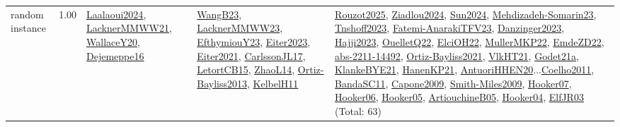 {\begin{longtable}{p{3cm}r>{\raggedright\arraybackslash}p{6cm}>{\raggedright\arraybackslash}p{6cm}>{\raggedright\arraybackslash}p{8cm}}
\index{random instance}\index{Benchmarks!random instance}random instance &  1.00 & \hyperref[detail:Laalaoui2024]{Laalaoui2024}, \hyperref[detail:LacknerMMWW21]{LacknerMMWW21}, \hyperref[detail:WallaceY20]{WallaceY20}, \hyperref[detail:Dejemeppe16]{Dejemeppe16} & \hyperref[detail:WangB23]{WangB23}, \hyperref[detail:LacknerMMWW23]{LacknerMMWW23}, \hyperref[detail:EfthymiouY23]{EfthymiouY23}, \hyperref[detail:Eiter2023]{Eiter2023}, \hyperref[detail:Eiter2021]{Eiter2021}, \hyperref[detail:CarlssonJL17]{CarlssonJL17}, \hyperref[detail:LetortCB15]{LetortCB15}, \hyperref[detail:ZhaoL14]{ZhaoL14}, \hyperref[detail:Ortiz-Bayliss2013]{Ortiz-Bayliss2013}, \hyperref[detail:KelbelH11]{KelbelH11} & \hyperref[detail:Rouzot2025]{Rouzot2025}, \hyperref[detail:Ziadlou2024]{Ziadlou2024}, \hyperref[detail:Sun2024]{Sun2024}, \hyperref[detail:Mehdizadeh-Somarin23]{Mehdizadeh-Somarin23}, \hyperref[detail:Tnshoff2023]{Tnshoff2023}, \hyperref[detail:Fatemi-AnarakiTFV23]{Fatemi-AnarakiTFV23}, \hyperref[detail:Danzinger2023]{Danzinger2023}, \hyperref[detail:Hajji2023]{Hajji2023}, \hyperref[detail:OuelletQ22]{OuelletQ22}, \hyperref[detail:ElciOH22]{ElciOH22}, \hyperref[detail:MullerMKP22]{MullerMKP22}, \hyperref[detail:EmdeZD22]{EmdeZD22}, \hyperref[detail:abs-2211-14492]{abs-2211-14492}, \hyperref[detail:Ortiz-Bayliss2021]{Ortiz-Bayliss2021}, \hyperref[detail:VlkHT21]{VlkHT21}, \hyperref[detail:Godet21a]{Godet21a}, \hyperref[detail:KlankeBYE21]{KlankeBYE21}, \hyperref[detail:HanenKP21]{HanenKP21}, \hyperref[detail:AntuoriHHEN20]{AntuoriHHEN20}...\hyperref[detail:Coelho2011]{Coelho2011}, \hyperref[detail:BandaSC11]{BandaSC11}, \hyperref[detail:Capone2009]{Capone2009}, \hyperref[detail:Smith-Miles2009]{Smith-Miles2009}, \hyperref[detail:Hooker07]{Hooker07}, \hyperref[detail:Hooker06]{Hooker06}, \hyperref[detail:Hooker05]{Hooker05}, \hyperref[detail:ArtiouchineB05]{ArtiouchineB05}, \hyperref[detail:Hooker04]{Hooker04}, \hyperref[detail:ElfJR03]{ElfJR03} (Total: 63)\\

\end{longtable}}
